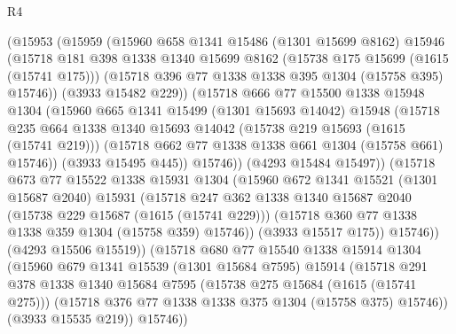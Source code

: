 \begin{lexlean}{R4}
\begin{coremodule}
            (@15953
              (@15959
                (@15960
                  @658
                  @1341
                  @15486
                  (@1301 @15699 @8162)
                  @15946
                  (@15718
                    @181
                    @398
                    @1338
                    @1340
                    @15699
                    @8162
                    (@15738 @175 @15699 (@1615 (@15741 @175)))
                    (@15718 @396 @77 @1338 @1338 @395 @1304 (@15758 @395) @15746))
                  (@3933 @15482 @229))
                (@15718
                  @666
                  @77
                  @15500
                  @1338
                  @15948
                  @1304
                  (@15960
                    @665
                    @1341
                    @15499
                    (@1301 @15693 @14042)
                    @15948
                    (@15718
                      @235
                      @664
                      @1338
                      @1340
                      @15693
                      @14042
                      (@15738 @219 @15693 (@1615 (@15741 @219)))
                      (@15718 @662 @77 @1338 @1338 @661 @1304 (@15758 @661) @15746))
                    (@3933 @15495 @445))
                  @15746))
              (@4293 @15484 @15497))
            (@15718
              @673
              @77
              @15522
              @1338
              @15931
              @1304
              (@15960
                @672
                @1341
                @15521
                (@1301 @15687 @2040)
                @15931
                (@15718
                  @247
                  @362
                  @1338
                  @1340
                  @15687
                  @2040
                  (@15738 @229 @15687 (@1615 (@15741 @229)))
                  (@15718 @360 @77 @1338 @1338 @359 @1304 (@15758 @359) @15746))
                (@3933 @15517 @175))
              @15746))
          (@4293 @15506 @15519))
        (@15718
          @680
          @77
          @15540
          @1338
          @15914
          @1304
          (@15960
            @679
            @1341
            @15539
            (@1301 @15684 @7595)
            @15914
            (@15718
              @291
              @378
              @1338
              @1340
              @15684
              @7595
              (@15738 @275 @15684 (@1615 (@15741 @275)))
              (@15718 @376 @77 @1338 @1338 @375 @1304 (@15758 @375) @15746))
            (@3933 @15535 @219))
          @15746))

\end{coremodule}
\end{lexlean}
